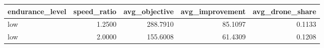 \begin{tabular}{lrrrr}
\toprule
endurance_level & speed_ratio & avg_objective & avg_improvement & avg_drone_share \\
\midrule
low & 1.2500 & 288.7910 & 85.1097 & 0.1133 \\
low & 2.0000 & 155.6008 & 61.4309 & 0.1208 \\
\bottomrule
\end{tabular}
